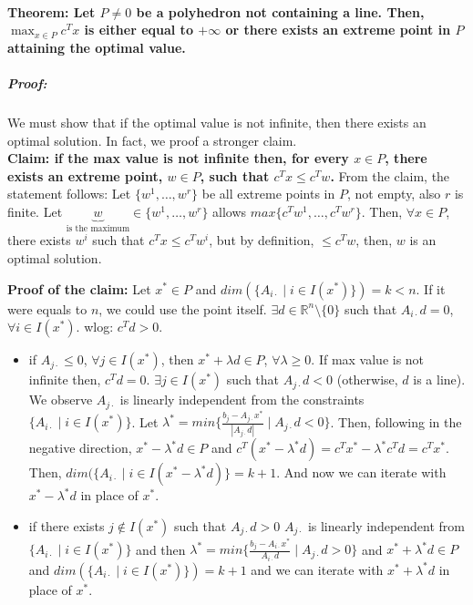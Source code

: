 \documentclass[main]{subfiles}
\begin{document}
\paragraph{Theorem: Let $P \neq 0$ be a polyhedron not containing a line. Then, $\displaystyle \max_{x \in P} c^{T}x$ is either equal to $+ \infty$ or there exists an extreme point in $P$ attaining the optimal value.}
\subparagraph{Proof:} We must show that if the optimal value is not infinite, then there exists an optimal solution. In fact, we proof a stronger claim. \\
\textbf{Claim: if the max value is not infinite then, for every $x \in P$, there exists an extreme point, $w \in P$, such that $c^{T}x \leq c^{T}w$.}
From the claim, the statement follows:
Let $\{w^{1}, \dots, w^{r}\}$ be all extreme points in $P$, not empty, also $r$ is finite. Let $\underbrace{w}_{\text{is the maximum}} \in \{w^{1}, \dots, w^{r}\}$ allows $max \{c^{T}w^{1}, \dots, c^{T}w^{r} \}$.
Then, $\forall x \in P$, there exists $w^{i}$ such that $c^{T}x \leq c^{T}w^{i}$, but by definition, $\leq c^{T}w$, then, $w$ is an optimal solution.

\begin{adjustwidth}{2.5em}{0pt}
\textbf{Proof of the claim:}
Let $x^{*} \in P$ and $dim(\{A_{i\cdot} \mid i \in I(x^{*})\}) = k < n$. If it were equals to $n$, we could use the point itself. $\exists d \in \mathbb{R}^{n} \setminus \{0\}$ such that $A_{i\cdot}d = 0$, $\forall i \in I(x^{*})$. wlog: $c^{T}d > 0$.

\begin{itemize}
\item if $A_{j\cdot} \leq 0$, $\forall j \in I(x^{*})$, then
\subitem $x^{*} + \lambda d \in P$, $\forall \lambda \geq 0$.
If max value is not infinite then, $c^{T}d = 0$.
$\exists j \in I(x^{*})$ such that $A_{j\cdot} d < 0$ (otherwise, $d$ is a line).
We observe $A_{j\cdot}$ is linearly independent from the constraints $\{A_{i\cdot} \mid i \in I(x^{*})\}$.
Let $\lambda^{*} = min\{\frac{b_{j} - A_{j\cdot}x^{*}}{|A_{j\cdot}d|} \mid A_{j\cdot}d < 0 \}$.
Then, following in the negative direction, $x^{*} - \lambda^{*} d \in P$ and $c^{T}(x^{*} - \lambda^{*}d) = c^{T}x^{*} - \lambda^{*}c^{T}d = c^{T}x^{*}$. Then, $dim(\{A_{i\cdot} \mid i \in I(x^{*} - \lambda^{*}d)\} = k+ 1$. And now we can iterate with $x^{*} - \lambda^{*}d$ in place of $x^{*}$.
\item if there exists $j \notin I(x^{*})$ such that $A_{j\cdot}d > 0$
\subitem $A_{j\cdot}$ is linearly independent from $\{A_{i\cdot} \mid i \in I(x^{*})\}$ and then $\lambda^{*} = min \{ \frac{b_{j} - A_{i\cdot} x^{*}}{A_{i\cdot}d} \mid A_{j\cdot}d > 0 \}$ and $x^{*} + \lambda^{*}d \in P$ and $dim(\{A_{i\cdot} \mid i \in I(x^{*})\}) = k+ 1$ and we can iterate with $x^{*} + \lambda^{*}d$ in place of $x^{*}$.
\end{itemize}
\end{adjustwidth}
\end{document}
